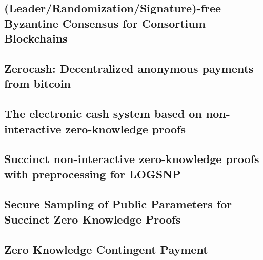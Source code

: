 \subsection{(Leader/Randomization/Signature)-free Byzantine Consensus for Consortium Blockchains\cite{DBLP:journals/corr/CrainGLR17}}

\subsection{Zerocash: Decentralized anonymous payments from bitcoin\cite{sasson2014zerocash}}

\subsection{The electronic cash system based on non-interactive zero-knowledge proofs\cite{doi:10.1080/00207160.2014.933816}}

\subsection{Succinct non-interactive zero-knowledge proofs with preprocessing for LOGSNP\cite{kalai2006succinct}}

\subsection{Secure Sampling of Public Parameters for Succinct Zero Knowledge Proofs\cite{ben2015secure}}

\subsection{Zero Knowledge Contingent Payment\cite{wiki2011zero}}





